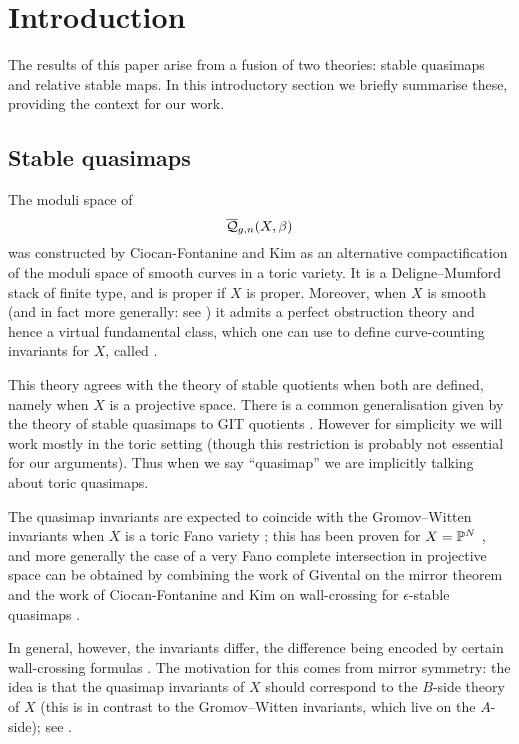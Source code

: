 \section{Introduction}
The results of this paper arise from a fusion of two theories: stable quasimaps and relative stable maps. In this introductory section we briefly summarise these, providing the context for our work.

\subsection{Stable quasimaps}
The moduli space of 
\begin{equation*} \overline{\mathcal Q}_{g,n}(X,\beta) \end{equation*}
was constructed by Ciocan-Fontanine and Kim \cite{CF-K} as an alternative compactification of the moduli space of smooth curves in a toric variety. It is a Deligne--Mumford stack of finite type, and is proper if $X$ is proper. Moreover, when $X$ is smooth (and in fact more generally: see \cite[\S 4.5]{CFKM}) it admits a perfect obstruction theory and hence a virtual fundamental class, which one can use to define curve-counting invariants for $X$, called .

This theory agrees with the theory of stable quotients \cite{MOP} when both are defined, namely when $X$ is a projective space.  There is a common generalisation given by the theory of stable quasimaps to GIT quotients \cite{CFKM}. However for simplicity we will work mostly in the toric setting (though this restriction is probably not essential for our arguments). Thus when we say ``quasimap'' we are implicitly talking about toric quasimaps.

The quasimap invariants are expected to coincide with the Gromov--Witten invariants when $X$ is a toric Fano variety \cite{CM}; this has been proven for $X=\mathbb P^N$ \cite{MOP} \cite[\S 5.4]{Manolache-Push}, and more generally the case of a very Fano complete intersection in projective space can be obtained by combining the work of Givental on the mirror theorem \cite[Theorem 0.1]{Givental-mirror} and the work of Ciocan-Fontanine and Kim on wall-crossing for $\epsilon$-stable quasimaps \cite[Conjecture 7.2.10]{CF-K}\cite[\S 5.5 and Conjecture 6.3.1]{CF-K-wallcrossing}.

In general, however, the invariants differ, the difference being encoded by certain wall-crossing formulas \cite{CF-K-wallcrossing}. The motivation for this comes from mirror symmetry: the idea is that the quasimap invariants of $X$ should correspond to the $B$-side theory of $X$ (this is in contrast to the Gromov--Witten invariants, which live on the $A$-side); see \cite[\S 7]{CF-K}. 

